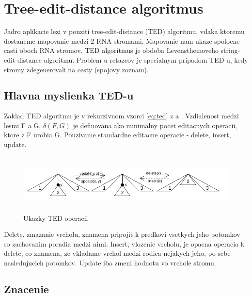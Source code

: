 \newcommand{\Cdel}{\ensuremath{c_{del}}}
\newcommand{\Cins}{\ensuremath{c_{ins}}}
\newcommand{\Cupd}{\ensuremath{c_{upd}}}
\renewcommand{\O}{\ensuremath{\mathcal{O}}}

\chapter{Tree-edit-distance algoritmus}

Jadro aplikacie lezi v pouziti tree-edit-distance (TED) algoritmu,
vdaka ktoremu dostaneme mapovanie medzi 2 RNA stromami. Mapovanie nam ukaze
spolocne casti oboch RNA stromov. TED algoritmus je obdoba Levenstheinoveho
string-edit-distance algoritmu. Problem u retazcov je specialnym pripadom
TED-u, kedy stromy zdegenerovali na cesty (spojovy zoznam).

\section{Hlavna myslienka TED-u}

Zaklad TED algoritmu je v rekurzivnom vzorci \ref{eq:ted} z \citet{DMRW} a \citet{RTED}. Vzdialenost medzi
lesmi F a G, $\delta(F, G)$ je definovana ako minimalny pocet editacnych operacii,
ktore z F urobia G. Pouzivame standardne editacne operacie - delete, insert, update.

\begin{figure}[H]
\centering
\includegraphics[width=140mm, height=30mm]{../img/TED_operations.png}
\caption{Ukazky TED operacii}
\label{obr:TED_operations}
\end{figure}

Delete, zmazanie vrcholu, znamena pripojit k predkovi vsetkych jeho potomkov so
zachovanim poradia medzi nimi. Insert, vlozenie vrcholu, je opacna operacia k
delete, co znamena, ze vkladame vrchol medzi rodica nejakych jeho, po sebe
nasledujucich potomkov. Update iba zmeni hodnotu vo vrchole stromu.

\section{Znacenie}


